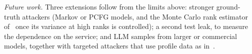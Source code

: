\documentclass[conference]{IEEEtran}
\begin{document}
\emph{Future work.} Three extensions follow from the limits above: stronger ground-truth attackers (Markov or PCFG models, and the Monte Carlo rank estimator of~\cite{dellamico2015} once its variance at high ranks is controlled); a second test leak, to measure the dependence on the service; and LLM samples from larger or commercial models, together with targeted attackers that use profile data as in~\cite{atzori2025}.



\end{document}
